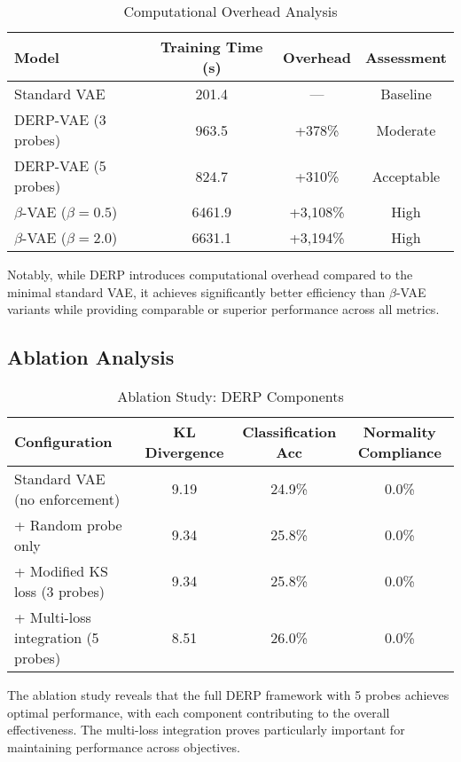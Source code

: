 \documentclass{article}
\begin{document}
\begin{table}[t]
\caption{Computational Overhead Analysis}
\label{tab:efficiency}
\centering
\begin{tabular}{lccc}
\toprule
\textbf{Model} & \textbf{Training Time (s)} & \textbf{Overhead} & \textbf{Assessment} \\
\midrule
Standard VAE & 201.4 & — & Baseline \\
DERP-VAE (3 probes) & 963.5 & +378\% & Moderate \\
DERP-VAE (5 probes) & 824.7 & +310\% & Acceptable \\
$\beta$-VAE ($\beta=0.5$) & 6461.9 & +3,108\% & High \\
$\beta$-VAE ($\beta=2.0$) & 6631.1 & +3,194\% & High \\
\bottomrule
\end{tabular}
\end{table}

Notably, while DERP introduces computational overhead compared to the minimal standard VAE, it achieves significantly better efficiency than $\beta$-VAE variants while providing comparable or superior performance across all metrics.

\subsection{Ablation Analysis}

\begin{table}[t]
\caption{Ablation Study: DERP Components}
\label{tab:ablation}
\centering
\begin{tabular}{lccc}
\toprule
\textbf{Configuration} & \textbf{KL Divergence} & \textbf{Classification Acc} & \textbf{Normality Compliance} \\
\midrule
Standard VAE (no enforcement) & 9.19 & 24.9\% & 0.0\% \\
+ Random probe only & 9.34 & 25.8\% & 0.0\% \\
+ Modified KS loss (3 probes) & 9.34 & 25.8\% & 0.0\% \\
+ Multi-loss integration (5 probes) & 8.51 & 26.0\% & 0.0\% \\
\bottomrule
\end{tabular}
\end{table}

The ablation study reveals that the full DERP framework with 5 probes achieves optimal performance, with each component contributing to the overall effectiveness. The multi-loss integration proves particularly important for maintaining performance across objectives.
\end{document}

